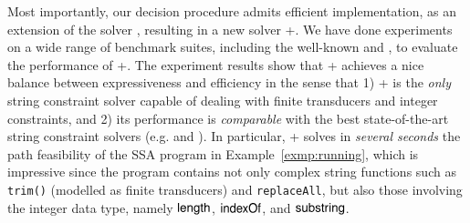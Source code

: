 Most importantly, our decision procedure admits efficient implementation, as an extension of the {\ostrich} solver \cite{CHL+19}, resulting in a new solver {\ostrich}+.  We have done experiments on a wide range of benchmark suites, including the well-known {\kaluzabench} and {\pyexbench}, to evaluate the performance of {\ostrich}+. The experiment results show that  {\ostrich}+ achieves a nice balance between expressiveness and efficiency in the sense that 1) {\ostrich}+ is the \emph{only} string constraint solver capable of dealing with finite transducers and integer constraints, and 2) its performance is \emph{comparable} with the best state-of-the-art string constraint solvers (e.g. {\cvc} and {\zthreetrau}). In particular, {\ostrich}+ solves in \emph{several seconds} the path feasibility of the SSA program in Example~\ref{exmp:running}, which is impressive since the program contains not only complex string functions such as {\tt trim()} (modelled as finite transducers) and {\tt replaceAll}, but also those involving the integer data type, namely $\mathsf{length}$, $\mathsf{indexOf}$, and $\mathsf{substring}$. 



